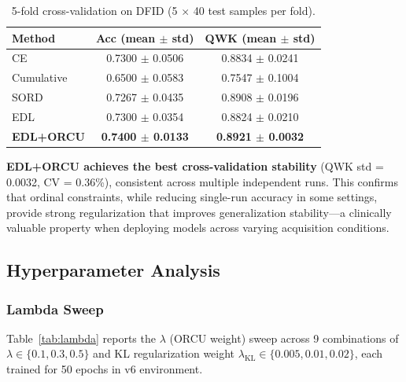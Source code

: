 \begin{table}[htbp]
\centering
\caption{5-fold cross-validation on DFID (5 $\times$ 40 test samples per fold).}
\label{tab:cv}
\begin{tabular}{lcc}
\toprule
\textbf{Method} & \textbf{Acc (mean $\pm$ std)} & \textbf{QWK (mean $\pm$ std)} \\
\midrule
CE & 0.7300 $\pm$ 0.0506 & 0.8834 $\pm$ 0.0241 \\
Cumulative & 0.6500 $\pm$ 0.0583 & 0.7547 $\pm$ 0.1004 \\
SORD & 0.7267 $\pm$ 0.0435 & 0.8908 $\pm$ 0.0196 \\
EDL & 0.7300 $\pm$ 0.0354 & 0.8824 $\pm$ 0.0210 \\
\textbf{EDL+ORCU} & \textbf{0.7400 $\pm$ 0.0133} & \textbf{0.8921 $\pm$ 0.0032} \\
\bottomrule
\end{tabular}
\end{table}

\textbf{EDL+ORCU achieves the best cross-validation stability} (QWK std = 0.0032, CV = 0.36\%), consistent across multiple independent runs. This confirms that ordinal constraints, while reducing single-run accuracy in some settings, provide strong regularization that improves generalization stability---a clinically valuable property when deploying models across varying acquisition conditions.

\subsection{Hyperparameter Analysis}

\subsubsection{Lambda Sweep}

Table~\ref{tab:lambda} reports the $\lambda$ (ORCU weight) sweep across 9 combinations of $\lambda \in \{0.1, 0.3, 0.5\}$ and KL regularization weight $\lambda_{\text{KL}} \in \{0.005, 0.01, 0.02\}$, each trained for 50 epochs in v6 environment.

